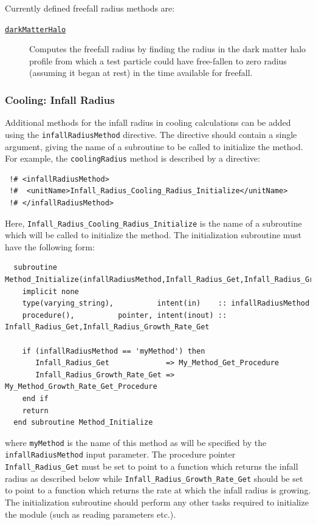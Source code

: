 Currently defined freefall radius methods are:
\begin{description}
 \item [\hyperlink{cooling.freefall_radii.dark_matter_halo.F90:freefall_radii_dark_matter_halo:freefall_radius_dark_matter_halo}{{\tt darkMatterHalo}}] Computes the freefall radius by finding the radius in the dark matter halo profile from which a test particle could have free-fallen to zero radius (assuming it began at rest) in the time available for freefall.
\end{description}

\subsubsection{Cooling: Infall Radius}

Additional methods for the infall radius in cooling calculations can be added using the {\tt infallRadiusMethod} directive. The directive should contain a single argument, giving the name of a subroutine to be called to initialize the method. For example, the {\tt coolingRadius} method is described by a directive:
\begin{verbatim}
 !# <infallRadiusMethod>
 !#  <unitName>Infall_Radius_Cooling_Radius_Initialize</unitName>
 !# </infallRadiusMethod>
\end{verbatim}
Here, {\tt Infall\_Radius\_Cooling\_Radius\_Initialize} is the name of a subroutine which will be called to initialize the method. The initialization subroutine must have the following form:
\begin{verbatim}
  subroutine Method_Initialize(infallRadiusMethod,Infall_Radius_Get,Infall_Radius_Growth_Rate_Get)
    implicit none
    type(varying_string),          intent(in)    :: infallRadiusMethod
    procedure(),          pointer, intent(inout) :: Infall_Radius_Get,Infall_Radius_Growth_Rate_Get
    
    if (infallRadiusMethod == 'myMethod') then
       Infall_Radius_Get             => My_Method_Get_Procedure
       Infall_Radius_Growth_Rate_Get => My_Method_Growth_Rate_Get_Procedure
    end if
    return
  end subroutine Method_Initialize
\end{verbatim}
where {\tt myMethod} is the name of this method as will be specified by the {\tt infallRadiusMethod} input parameter. The procedure pointer {\tt Infall\_Radius\_Get} must be set to point to a function which returns the infall radius as described below while {\tt Infall\_Radius\_Growth\_Rate\_Get} should be set to point to a function which returns the rate at which the infall radius is growing. The initialization subroutine should perform any other tasks required to initialize the module (such as reading parameters etc.).

